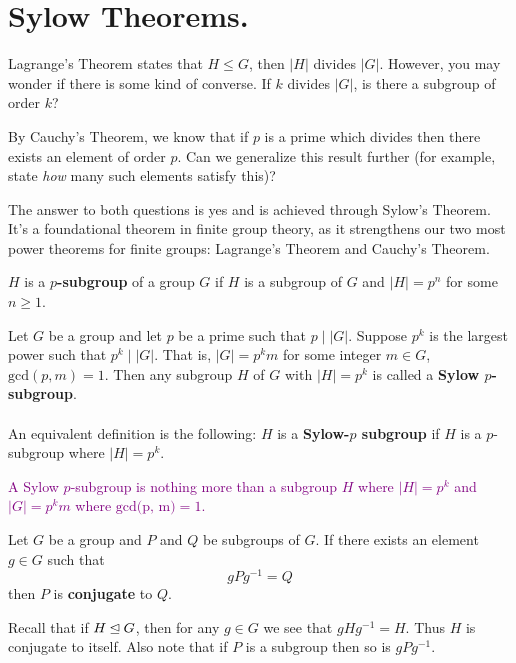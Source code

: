     \newpage
    \section{Sylow Theorems.}
    Lagrange's Theorem states that $H \le G$, then $|H|$ divides
    $|G|$. However, you may wonder if there is some kind of converse.
    If $k$ divides $|G|$, is there a subgroup of order $k$? 

    By Cauchy's Theorem, we know that if $p$ is a prime which divides
    then there exists an element of order $p$. Can we generalize this
    result further (for example, state \textit{how} many such elements
    satisfy this)? 

    The answer to both questions is yes and is achieved through
    Sylow's Theorem. It's a foundational theorem in finite group
    theory, as it
    strengthens our two most power theorems for finite groups:
    Lagrange's Theorem and Cauchy's Theorem.

    \begin{definition}
        $H$ is a \textbf{$p$-subgroup} of a group $G$ if $H$ is a
        subgroup of $G$ and $|H| = p^n$ for some $n \ge 1$.
    \end{definition}

    \begin{definition}
        Let $G$ be a group and let $p$ be a prime such that $p\mid
        |G|$. Suppose $p^k$ is the largest power such that $p^k \mid
        |G|$. That is, $|G| = p^km$ for some integer $m \in G$,
        $\mbox{gcd}(p, m) = 1$. Then any subgroup $H$ of $G$ with $|H| = p^k$ is called a
        \textbf{Sylow $p$-subgroup}.
        \\
        \\
        An equivalent definition is the following: $H$ is a 
        \textbf{Sylow-$p$ subgroup} if $H$ is a $p$-subgroup where
        $|H| = p^k$.
    \end{definition}

    \textcolor{purple}{A Sylow $p$-subgroup is nothing more than a subgroup $H$ where
    $|H| = p^k$ and $|G| = p^km$ where $\mbox{gcd(p, m)} = 1$.}

    \begin{definition}
        Let $G$ be a group and $P$ and $Q$ be subgroups of $G$. If
        there exists an element $g \in G$ such that 
        \[
            gPg^{-1} = Q
        \]
        then $P$ is \textbf{conjugate} to $Q$.
    \end{definition}
    Recall that if $H \unlhd G$, then for any $g \in G$ we see that
    $gHg^{-1} = H$. Thus $H$ is conjugate to itself.
    Also note that if $P$ is a subgroup then so is $gPg^{-1}$.

